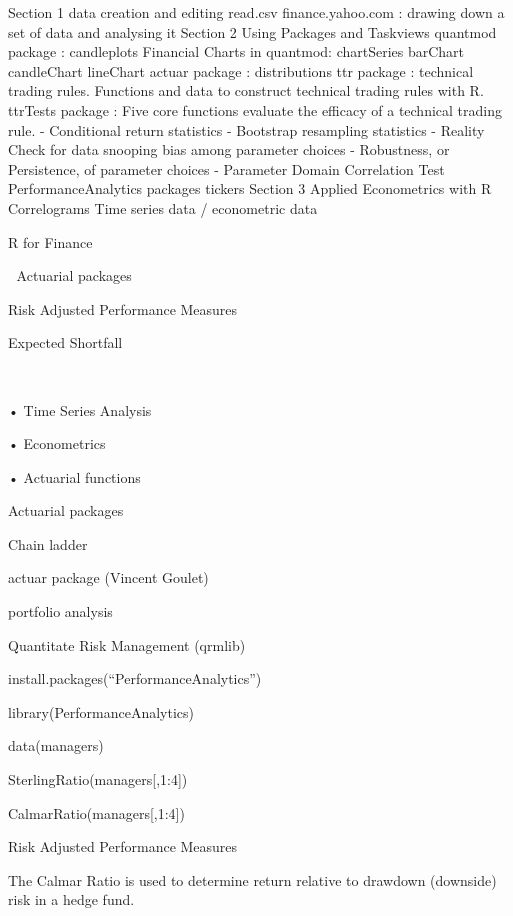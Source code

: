 Section 1
data creation and editing
read.csv
finance.yahoo.com : drawing down a set of data and analysing it
Section 2
Using Packages and Taskviews
quantmod package : candleplots 
Financial Charts in quantmod:
chartSeries
barChart
candleChart
lineChart
actuar package : distributions
ttr package : technical trading rules. Functions and data to construct technical trading rules with R.
ttrTests package : Five core functions evaluate the efficacy of a technical trading rule. - Conditional return statistics - Bootstrap resampling statistics - Reality Check for data snooping bias among parameter choices - Robustness, or Persistence, of parameter choices - Parameter Domain Correlation Test
PerformanceAnalytics packages
tickers
Section 3 Applied Econometrics with R
Correlograms
Time series data / econometric data

R for Finance


Actuarial packages

Risk Adjusted Performance Measures

Expected Shortfall



•
Time Series Analysis

•
Econometrics

•
Actuarial functions



 

Actuarial packages

Chain ladder

actuar package (Vincent Goulet)


portfolio analysis

Quantitate Risk Management (qrmlib)









install.packages(“PerformanceAnalytics”)

library(PerformanceAnalytics)


data(managers)

SterlingRatio(managers[,1:4])

CalmarRatio(managers[,1:4])
 






Risk Adjusted Performance Measures


The Calmar Ratio is used to determine return relative to drawdown (downside) risk in a hedge fund.


